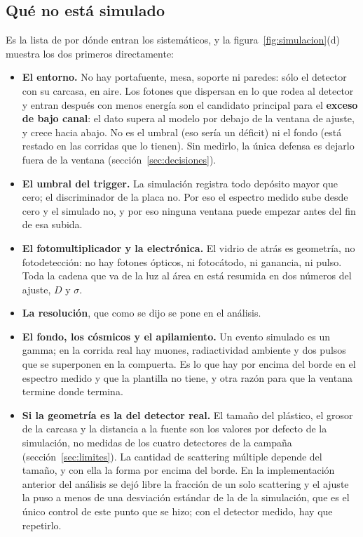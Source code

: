 \documentclass[11pt,a4paper]{article}
\begin{document}
\subsection{Qué no está simulado}

Es la lista de por dónde entran los sistemáticos, y la figura~\ref{fig:simulacion}(d)
muestra los dos primeros directamente:

\begin{itemize}
\item \textbf{El entorno.} No hay portafuente, mesa, soporte ni paredes:
      sólo el detector con su carcasa, en aire. Los fotones que dispersan en
      lo que rodea al detector y entran después con menos energía son el
      candidato principal para el \textbf{exceso de bajo canal}: el dato
      supera al modelo por debajo de la ventana de ajuste, y crece hacia
      abajo. No es el umbral (eso sería un déficit) ni el fondo (está
      restado en las corridas que lo tienen). Sin medirlo, la única defensa
      es dejarlo fuera de la ventana (sección~\ref{sec:decisiones}).
\item \textbf{El umbral del trigger.} La simulación registra todo depósito
      mayor que cero; el discriminador de la placa no. Por eso el espectro
      medido sube desde cero y el simulado no, y por eso ninguna ventana
      puede empezar antes del fin de esa subida.
\item \textbf{El fotomultiplicador y la electrónica.} El vidrio de atrás es
      geometría, no fotodetección: no hay fotones ópticos, ni fotocátodo, ni
      ganancia, ni pulso. Toda la cadena que va de la luz al área en \mVns{}
      está resumida en dos números del ajuste, $D$ y $\sigma$.
\item \textbf{La resolución}, que como se dijo se pone en el análisis.
\item \textbf{El fondo, los cósmicos y el apilamiento.} Un evento simulado
      es un gamma; en la corrida real hay muones, radiactividad ambiente y
      dos pulsos que se superponen en la compuerta. Es lo que hay por encima
      del borde en el espectro medido y que la plantilla no tiene, y otra
      razón para que la ventana termine donde termina.
\item \textbf{Si la geometría es la del detector real.} El tamaño del
      plástico, el grosor de la carcasa y la distancia a la fuente son los
      valores por defecto de la simulación, no medidas de los cuatro
      detectores de la campaña (sección~\ref{sec:limites}). La cantidad de
      scattering múltiple depende del tamaño, y con ella la forma por
      encima del borde. En la implementación anterior del análisis se dejó
      libre la fracción de un solo scattering y el ajuste la puso a menos de
      una desviación estándar de la de la simulación, que es el único control
      de este punto que se hizo; con el detector medido, hay que repetirlo.
\end{itemize}
\end{document}
